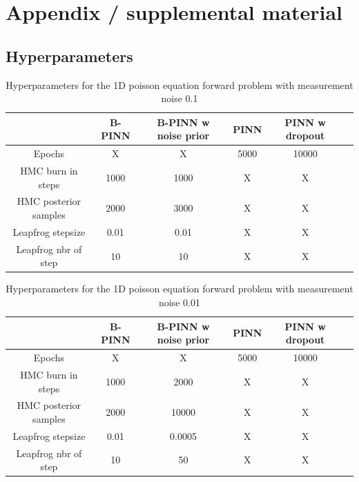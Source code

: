 \documentclass{article}
\begin{document}




\appendix

\section{Appendix / supplemental material}
\subsection{Hyperparameters}



\begin{table}[H]
\centering
\begin{tabular}{|c|c|c|c|c|c|}
\hline
 & B-PINN & B-PINN w noise prior  & PINN & PINN w dropout  \\
\hline
Epochs  & \large{X} & \large{X} & 5000 & 10000\\
\hline
HMC burn in steps & 1000 & 1000 & \large{X} & \large{X} \\
\hline
HMC posterior samples &  2000 & 3000 & \large{X}  & \large{X} \\
\hline
Leapfrog stepsize & 0.01 & 0.01 & \large{X}  & \large{X} \\
\hline
Leapfrog nbr of step & 10 & 10 & \large{X}  & \large{X} \\
\hline
\end{tabular}
\caption{Hyperparameters for the 1D poisson equation forward problem with measurement noise 0.1}
\label{tab:hp}
\end{table}


\begin{table}[H]
\centering
\begin{tabular}{|c|c|c|c|c|c|}
\hline
 & B-PINN & B-PINN w noise prior  & PINN & PINN w dropout  \\
\hline
Epochs  & \large{X} & \large{X} & 5000 & 10000 \\
\hline
HMC burn in steps & 1000 &  2000 & \large{X} & \large{X} \\
\hline
HMC posterior samples &  2000 &  10000& \large{X}  & \large{X} \\
\hline
Leapfrog stepsize & 0.01 & 0.0005   & \large{X}  & \large{X} \\
\hline
Leapfrog nbr of step & 10 & 50 & \large{X}  & \large{X} \\
\hline
\end{tabular}
\caption{Hyperparameters for the 1D poisson equation forward problem with measurement noise 0.01}
\label{tab:hp2}
\end{table}
\end{document}
